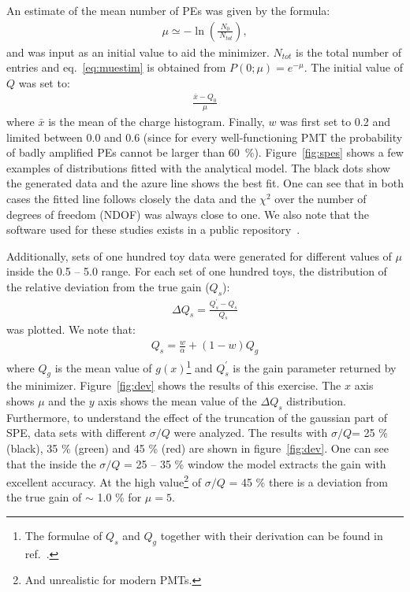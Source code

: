 \documentclass[preprint,12pt]{elsarticle}
\begin{document}
An estimate of the mean number of PEs was given by the formula: 
\begin{align}
\mu \simeq - \ln \left(  \frac{N_0}{\ N_{tot}} \right),  
\label{eq:muestim}
\end{align}
and was input as an initial value to aid the minimizer. 
$N_{tot}$ is the total number of entries and eq.~\eqref{eq:muestim} is obtained from $P(0; \mu ) = e^{-\mu}$. 
The initial value of $Q$ was set to: 
\begin{align}
\frac{ \bar x - Q_0 }{\mu}
\label{eq:laestim}
\end{align}
where $\bar x$ is the mean of the charge histogram. 
Finally, $w$ was first set to 0.2 and limited between 0.0 and 0.6 (since for every well-functioning PMT the probability of badly amplified PEs cannot be larger than 60~\%).
Figure~\ref{fig:spes} shows a few examples of distributions fitted with the analytical model. 
The black dots show the generated data and the azure line shows the best fit. 
One can see that in both cases the fitted line follows closely the data and the $\chi^2$ over the number of degrees of freedom (NDOF) was always close to one. 
We also note that the software used for these studies exists in a public repository~\cite{git}. 

Additionally, sets of one hundred toy data were generated for different values of $\mu$ inside the 0.5 -- 5.0 range. 
For each set of one hundred toys, the distribution of the relative deviation from the true gain ($Q_s$):
\begin{align}
\Delta Q_s = \frac{ Q_s^\prime - Q_s }{ Q_s }
\label{eq:laestim}
\end{align}
was plotted. We note that:
\begin{align}
 Q_s = \frac{w}{\alpha} + (1-w)Q_g
\label{eq:laestim}
\end{align}
where $Q_g$ is the mean value of $g(x)$\footnote{The formulae of $Q_s$ and $Q_g$ together with their derivation can be found in ref.~\cite{me2}. } and $Q_s^\prime$ is the gain parameter returned by the minimizer.
Figure~\ref{fig:dev} shows the results of this exercise. 
The $x$ axis shows $\mu$ and the $y$ axis shows the mean value of the $\Delta Q_s$ distribution. 
Furthermore, to understand the effect of the truncation of the gaussian part of SPE,  data sets with different $\sigma/Q$ were analyzed. 
The results with $\sigma/Q$= 25 \% (black), 35 \% (green) and 45 \% (red) are shown in figure~\ref{fig:dev}. 
One can see that the inside the $\sigma/Q$ = 25 -- 35 \% window the model extracts the gain with excellent accuracy. 
At the high value\footnote{And unrealistic for modern PMTs.}  of $\sigma/Q$ = 45 \% there is a deviation from the true gain of $\sim$ 1.0 \% for $\mu = 5$.
\end{document}
